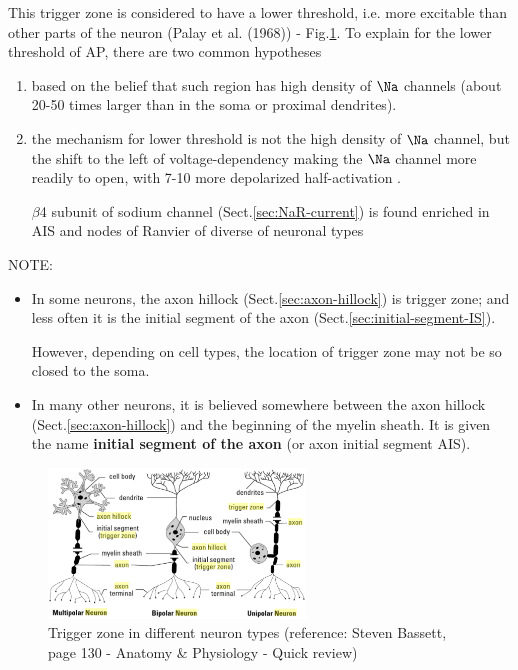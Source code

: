 This trigger zone is considered to have a lower threshold, i.e. more excitable
than other parts of the neuron (Palay et al. (1968)) -
Fig.\ref{fig:trigger-zone}. To explain for the lower threshold of AP, there are
two common hypotheses

\begin{enumerate}
  
  \item   based on the belief that such region has high density of $\Na$
  channels  (about 20-50 times larger than in the soma or proximal dendrites).
    
  \item the mechanism for lower threshold is not the high density of $\Na$
  channel, but the shift to the left of voltage-dependency making the $\Na$
  channel more readily to open, with 7-10 more depolarized half-activation
  \citep{colbert2002}.
  
  $\beta$4 subunit of sodium channel (Sect.\ref{sec:NaR-current})
  is found enriched in AIS and nodes of Ranvier of diverse of neuronal types
  
\end{enumerate}

NOTE:
\begin{itemize}
  \item  In some neurons, the axon hillock (Sect.\ref{sec:axon-hillock}) is
  trigger zone; and less often it is the initial segment of the axon
  (Sect.\ref{sec:initial-segment-IS}).
  
  However, depending on cell types, the location of trigger zone may not be so
  closed to the soma.
  
  \item  In many other neurons, it is believed somewhere between the axon hillock
(Sect.\ref{sec:axon-hillock}) and the beginning of the myelin sheath. 
It is given the name {\bf initial segment of the axon} (or axon initial segment
AIS).
  
\end{itemize}

\begin{figure}[hbt]
 \centerline{\includegraphics[height=4cm]{./images/trigger-zone.eps}}
 \caption{Trigger zone in different neuron types (reference: Steven Bassett,
 page 130 - Anatomy \& Physiology - Quick review)}
\label{fig:trigger-zone}
\end{figure}

